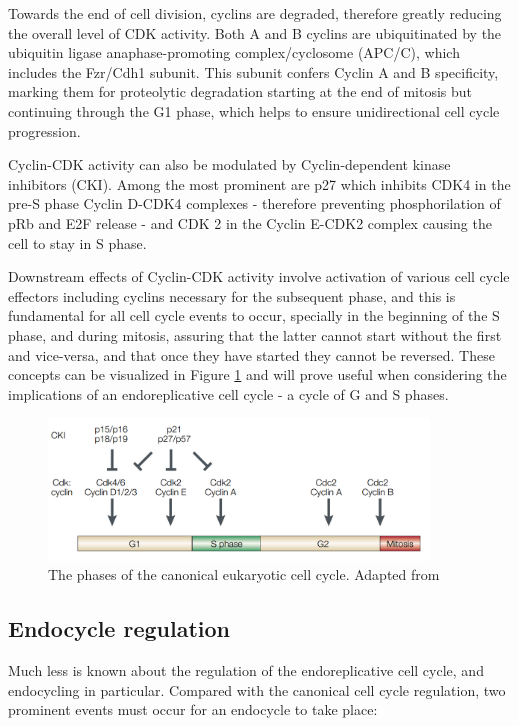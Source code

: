 \documentclass[11pt,twoside,a4paper]{report}
\begin{document}
				Towards the end of cell division, cyclins are degraded, therefore greatly reducing the overall level of CDK activity. Both A and B cyclins are ubiquitinated by the ubiquitin ligase anaphase-promoting complex/cyclosome (APC/C), which includes the Fzr/Cdh1 subunit. This subunit confers Cyclin A and B specificity, marking them for proteolytic degradation starting at the end of mitosis but continuing through the G1 phase, which helps to ensure unidirectional cell cycle progression.	
				
				Cyclin-CDK activity can also be modulated by Cyclin-dependent kinase inhibitors (CKI). Among the most prominent are p27 which inhibits CDK4 in the pre-S phase Cyclin D-CDK4 complexes - therefore preventing phosphorilation of pRb and E2F release - and CDK 2 in the Cyclin E-CDK2 complex causing the cell to stay in S phase.
				
				Downstream effects of Cyclin-CDK activity involve activation of various cell cycle effectors including cyclins necessary for the subsequent phase, and this is fundamental for all cell cycle events to occur, specially in the beginning of the S phase, and during mitosis, assuring that the latter cannot start without the first and vice-versa, and that once they have started they cannot be reversed. These concepts can be visualized in Figure \ref{fig:canonical_cycle} and will prove useful when considering the implications of an endoreplicative cell cycle - a cycle of G and S phases.
				
				\begin{figure}[here]
					\centering
					\includegraphics[width=0.9\textwidth]{pngs/canonical_cell_cycle.png}
					\caption{The phases of the canonical eukaryotic cell cycle. {\footnotesize Adapted from \cite{Trimarchi2002}}}
					\label{fig:canonical_cycle}
				\end{figure}

			\subsection{Endocycle regulation}
			Much less is known about the regulation of the endoreplicative cell cycle, and endocycling in particular. Compared with the canonical cell cycle regulation, two prominent events must occur for an endocycle to take place:
			
\end{document}
